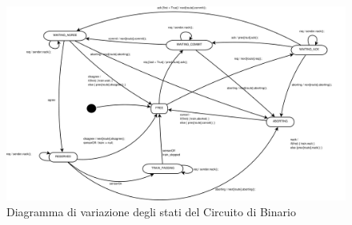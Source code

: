 \begin{figure}

\centering
\includegraphics[width=24cm]{imgs/TrackCircuit.pdf}

\caption{Diagramma di variazione degli stati del Circuito
di Binario}\label{fig:Circuito}

\end{figure}



